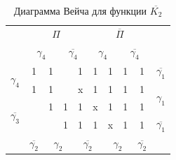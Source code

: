 \documentclass[a4paper,14pt]{article}
\begin{document}
\begin{table}[H]
		\begin{center}
		\caption{\label{tab:dvKorrNK2} Диаграмма Вейча для функции $\overline{K_2}$}
	\begin{tabular}{cccccccccc}
		& \multicolumn{4}{c}{$\Pi$}                                                                             & \multicolumn{4}{c}{$\overline{\Pi}$}                                                                            &                     \\
		& \multicolumn{2}{c}{$\gamma_4$}                          & \multicolumn{2}{c}{$\overline{\gamma_4}$}                         & \multicolumn{2}{c}{$\gamma_4$}                          & \multicolumn{2}{c}{$\overline{\gamma_4}$}                         &                     \\ \cline{2-9}
		\multicolumn{1}{c|}{\multirow{2}{*}{$\gamma_4$}}  & \multicolumn{1}{c|}{1} & \multicolumn{1}{c|}{1} & \multicolumn{1}{c|}{}  & \multicolumn{1}{c|}{1} & \multicolumn{1}{c|}{1} & \multicolumn{1}{c|}{1} & \multicolumn{1}{c|}{1} & \multicolumn{1}{c|}{1} & $\overline{\gamma_1}$                 \\ \cline{2-9}
		\multicolumn{1}{c|}{}                     & \multicolumn{1}{c|}{1} & \multicolumn{1}{c|}{1} & \multicolumn{1}{c|}{}  & \multicolumn{1}{c|}{x} & \multicolumn{1}{c|}{1} & \multicolumn{1}{c|}{1} & \multicolumn{1}{c|}{1} & \multicolumn{1}{c|}{1} & \multirow{2}{*}{$\gamma_1$} \\ \cline{2-9}
		\multicolumn{1}{c|}{\multirow{2}{*}{$\overline{\gamma_3}$}} & \multicolumn{1}{c|}{}  & \multicolumn{1}{c|}{1} & \multicolumn{1}{c|}{1} & \multicolumn{1}{c|}{1} & \multicolumn{1}{c|}{x} & \multicolumn{1}{c|}{1} & \multicolumn{1}{c|}{1} & \multicolumn{1}{c|}{1} &                     \\ \cline{2-9}
		\multicolumn{1}{c|}{}                     & \multicolumn{1}{c|}{}  & \multicolumn{1}{c|}{}  & \multicolumn{1}{c|}{1} & \multicolumn{1}{c|}{1} & \multicolumn{1}{c|}{1} & \multicolumn{1}{c|}{x} & \multicolumn{1}{c|}{1} & \multicolumn{1}{c|}{1} & $\overline{\gamma_1}$                \\ \cline{2-9}
		&$\overline{\gamma_2}$               & \multicolumn{2}{c}{$\gamma_2$}                          & \multicolumn{2}{c}{$\overline{\gamma_2}$}                         & \multicolumn{2}{c}{$\gamma_2$}                          & $\overline{\gamma_2}$                   &                    
	\end{tabular}
\end{center}
\end{table}
\end{document}
